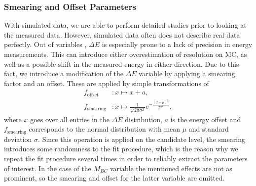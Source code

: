 \subsubsection{Smearing and Offset Parameters}\label{sec:smearing-and-offset-parameters}
With simulated data, we are able to perform detailed studies prior to looking at the measured data. However, simulated data often does not describe real data perfectly. Out of variables \vars, $\Delta E$ is especially prone to a lack of precision in energy measurements. This can introduce either overestimation of resolution on MC, as well as a possible shift in the measured energy in either direction. Due to this fact, we introduce a modification of the $\Delta E$ variable by applying a smearing factor and an offset. These are applied by simple transformations of 
\begin{align}
\label{eq:smearingoffset}
f_{\mathrm{offset}}&: x \mapsto x + a, \\
f_{\mathrm{smearing}}&: x \mapsto \frac{1}{\sqrt{2\pi \sigma^2}} \mathrm{e}^{-\frac{(x-\mu)^2}{2\sigma^2}},
\end{align}
where $x$ goes over all entries in the $\Delta E$ distribution, $a$ is the energy offset and $f_{\mathrm{smearing}}$ corresponds to the normal distribution with mean $\mu$ and standard deviation $\sigma$. Since this operation is applied on the candidate level, the smearing introduces some randomness to the fit procedure, which is the reason why we repeat the fit procedure several times in order to reliably extract the parameters of interest. In the case of the $M_{BC}$ variable the mentioned effects are not as prominent, so the smearing and offset for the latter variable are omitted. 

